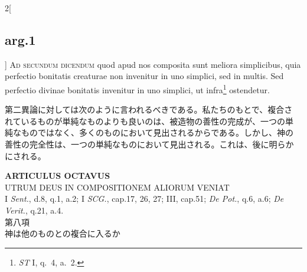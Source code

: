 \documentclass[paper=a4paper,fontsize=10pt,jafontsize=9pt,titlepage]{jlreq}
\begin{document}
\begin{paracol}{2}[\subsection{arg.1}]
{\scshape Ad secundum dicendum} quod apud nos composita sunt meliora
 simplicibus, quia perfectio bonitatis creaturae non invenitur in uno
 simplici, sed in multis. Sed perfectio divinae bonitatis invenitur in
 uno simplici, ut infra\footnote{{\itshape ST} I, q.~4, a.~2.} ostendetur.

\switchcolumn

第二異論に対しては次のように言われるべきである。私たちのもとで、複合さ
れているものが単純なものよりも良いのは、被造物の善性の完成が、一つの単
純なものではなく、多くのものにおいて見出されるからである。しかし、神の
善性の完全性は、一つの単純なものにおいて見出される。これは、後に明らか
にされる。

\end{paracol}

\newpage
{}
{}
\setcounter{section}{8}
\setcounter{subsection}{0}
\begin{center}
 {\Large {\bfseries ARTICULUS OCTAVUS}}\\
 {\large UTRUM DEUS IN COMPOSITIONEM ALIORUM VENIAT}\\
 {\footnotesize I {\itshape Sent.}, d.8, q.1, a.2; I {\itshape SCG.},
 cap.17, 26, 27; III, cap.51; {\itshape De Pot.}, q.6, a.6; {\itshape De
 Verit.}, q.21, a.4.}\\
 {\Large 第八項\\神は他のものとの複合に入るか}
\end{center}
\end{document}
